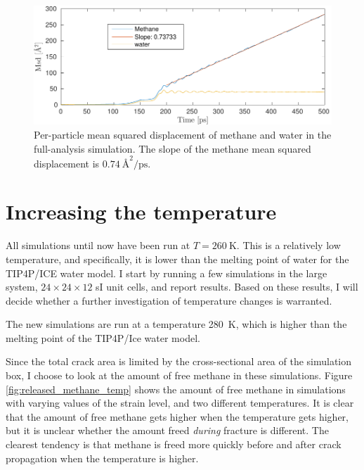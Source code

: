 \begin{figure}
\centering
\includegraphics[width=14cm]{../figures/thesis/methane_crack_diffusion.pdf}
\caption{Per-particle mean squared displacement of methane and water in the full-analysis simulation. The slope of the methane mean squared displacement is $\SI{0.74}{\angstrom\squared\per\pico\second}$.}
\label{fig:msq_methane_crack}
\end{figure}

\section{Increasing the temperature}
All simulations until now have been run at $T=\SI{260}{\kelvin}$. This is a relatively low temperature, and specifically, it is lower than the melting point of water for the TIP4P/ICE water model. I start by running a few simulations in the large system, $24\times 24\times 12$ sI unit cells, and report results. Based on these results, I will decide whether a further investigation of temperature changes is warranted.

The new simulations are run at a temperature \SI{280}{\kelvin}, which is higher than the melting point of the TIP4P/Ice water model. 

Since the total crack area is limited by the cross-sectional area of the simulation box, I choose to look at the amount of free methane in these simulations. Figure \ref{fig:released_methane_temp} shows the amount of free methane in simulations with varying values of the strain level, and two different temperatures. It is clear that the amount of free methane gets higher when the temperature gets higher, but it is unclear whether the amount freed \emph{during} fracture is different. The clearest tendency is that methane is freed more quickly before and after crack propagation when the temperature is higher. 

